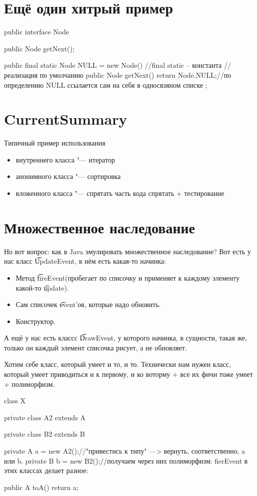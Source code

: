 \section{Ещё один хитрый пример}
\begin{javacode}
public interface Node {
	public Node getNext();

	public final static Node NULL = new Node() {//final static -- константа
		//реализация по умолчанию
		public Node getNext() {
			return Node.NULL;//по определению NULL ссылается сам на себя в односвзяном списке
		}
	};
}
\end{javacode}

\section{CurrentSummary}
Типичный пример использования 
\begin{itemize}
	\item
		внутреннего класса "--- итератор
	\item
		анонимного класса "--- сортировка
	\item
		вложенного класса "--- спрятать часть кода спрятать + тестирование
\end{itemize}

\section{Множественное наследование}
Но вот вопрос: как в Java эмулировать множественное наследование?
Вот есть у нас класс \t{UpdateEvent}, в нём есть какая-то начинка:
\begin{itemize}
	\item
		Метод \t{fireEvent}(пробегает по списочку и применяет к каждому элементу какой-то \t{update}).
	\item
		Сам списочек \t{event}'ов, которые надо обновить.
	\item
		Конструктор.
\end{itemize}
А ещё у нас есть классс \t{DrawEvent}, у которого начинка, в сущности, такая же,
только он каждый элемент списочка рисует, а не обновляет.

Хотим себе класс, который умеет и то, и то. 
Технически нам нужен класс, который умеет приводиться и к первому, и ко воторму + 
все их фичи тоже умеет + полиморфизм.

\begin{javacode}
class X {
	private class A2 extends A {

	}

	private class B2 extends B {

	}

	private A a = new A2();//"привестись к типу" ---> вернуть, соответственно, a или b.
	private B b = new B2();//получаем через них полиморфизм: fierEvent в этих классах делает разное:

	public A toA() {return a;}
}
\end{javacode}

